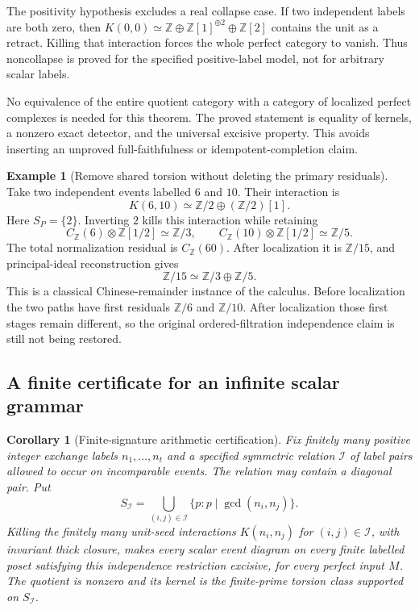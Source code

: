 \documentclass[11pt]{article}
\newtheorem{corollary}[theorem]{Corollary}
\theoremstyle{definition}
\newtheorem{example}[theorem]{Example}
\theoremstyle{remark}
\begin{document}
The positivity hypothesis excludes a real collapse case. If two independent labels are both zero, then $K(0,0)\simeq\mathbb Z\oplus\mathbb Z[1]^{\oplus2}\oplus\mathbb Z[2]$ contains the unit as a retract. Killing that interaction forces the whole perfect category to vanish. Thus noncollapse is proved for the specified positive-label model, not for arbitrary scalar labels.

No equivalence of the entire quotient category with a category of localized perfect complexes is needed for this theorem. The proved statement is equality of kernels, a nonzero exact detector, and the universal excisive property. This avoids inserting an unproved full-faithfulness or idempotent-completion claim.

\begin{example}[Remove shared torsion without deleting the primary residuals]\label{ex:six-ten}
Take two independent events labelled $6$ and $10$. Their interaction is
\[
 K(6,10)\simeq\mathbb Z/2\oplus(\mathbb Z/2)[1].
\]
Here $S_P=\{2\}$. Inverting $2$ kills this interaction while retaining
\[
 C_{\mathbb Z}(6)\otimes\mathbb Z[1/2]\simeq\mathbb Z/3,
 \qquad
 C_{\mathbb Z}(10)\otimes\mathbb Z[1/2]\simeq\mathbb Z/5.
\]
The total normalization residual is $C_{\mathbb Z}(60)$. After localization it is $\mathbb Z/15$, and principal-ideal reconstruction gives
\[
 \mathbb Z/15\simeq\mathbb Z/3\oplus\mathbb Z/5.
\]
This is a classical Chinese-remainder instance of the calculus. Before localization the two paths have first residuals $\mathbb Z/6$ and $\mathbb Z/10$. After localization those first stages remain different, so the original ordered-filtration independence claim is still not being restored.
\end{example}

\subsection{A finite certificate for an infinite scalar grammar}

\begin{corollary}[Finite-signature arithmetic certification]\label{cor:finite-signature}
Fix finitely many positive integer exchange labels $n_1,\ldots,n_t$ and a specified symmetric relation $\mathcal I$ of label pairs allowed to occur on incomparable events. The relation may contain a diagonal pair. Put
\[
 S_{\mathcal I}=\bigcup_{(i,j)\in\mathcal I}
 \{p:p\mid\gcd(n_i,n_j)\}.
\]
Killing the finitely many unit-seed interactions $K(n_i,n_j)$ for $(i,j)\in\mathcal I$, with invariant thick closure, makes every scalar event diagram on every finite labelled poset satisfying this independence restriction excisive, for every perfect input $M$. The quotient is nonzero and its kernel is the finite-prime torsion class supported on $S_{\mathcal I}$.
\end{corollary}
\end{document}
